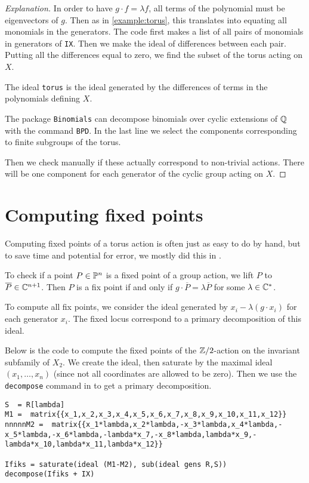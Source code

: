 \begin{proof}[Explanation]
In order to have $g \cdot f = \lambda f$, all terms of the polynomial must be eigenvectors of $g$. Then as in \cref{example:torus},  this translates into equating all monomials in the generators. The code first makes a list of all pairs of monomials in generators of \texttt{IX}. Then we make the ideal of differences between each pair. Putting all the differences equal to zero, we find the subset of the torus acting on $X$.

The ideal \texttt{torus} is the ideal generated by the differences of terms in the polynomials defining $X$.

The \MM package \texttt{Binomials} \cite{kahle_binomials} can decompose binomials over cyclic extensions of $\Q$ with the command \texttt{BPD}. In the last line we select the components corresponding to finite subgroups of the torus.

Then we check manually if these actually correspond to non-trivial actions. There will be one component for each generator of the cyclic group acting on $X$.
\end{proof}

\section{Computing fixed points}

Computing fixed points of a torus action is often just as easy to do by hand, but to save time and potential for error, we mostly did this in \MM.

To check if a point $P \in \P^n$ is a fixed point of a group action, we lift $P$ to $\overline{P} \in \C^{n+1}$. Then $P$ is a fix point if and only if $g \cdot \overline P = \lambda \overline P$ for some $\lambda \in \C^\ast$.

To compute all fix points, we consider the ideal generated by $x_i - \lambda (g \cdot x_i)$ for each generator $x_i$. The fixed locus correspond to a primary decomposition of this ideal.

Below is the code to compute the fixed points of the $\Z/2$-action on the invariant subfamily of $X_2$. We create the ideal, then saturate by the maximal ideal $(x_1,\ldots,x_n)$ (since not all coordinates are allowed to be zero). Then we use the \texttt{decompose} command in \MM to get a primary decomposition.

\begin{lstlisting}[language=Macaulay2]
S  = R[lambda]
M1 =  matrix{{x_1,x_2,x_3,x_4,x_5,x_6,x_7,x_8,x_9,x_10,x_11,x_12}}
nnnnnM2 =  matrix{{x_1*lambda,x_2*lambda,-x_3*lambda,x_4*lambda,-x_5*lambda,-x_6*lambda,-lambda*x_7,-x_8*lambda,lambda*x_9,-lambda*x_10,lambda*x_11,lambda*x_12}}

Ifiks = saturate(ideal (M1-M2), sub(ideal gens R,S))
decompose(Ifiks + IX)
\end{lstlisting}

